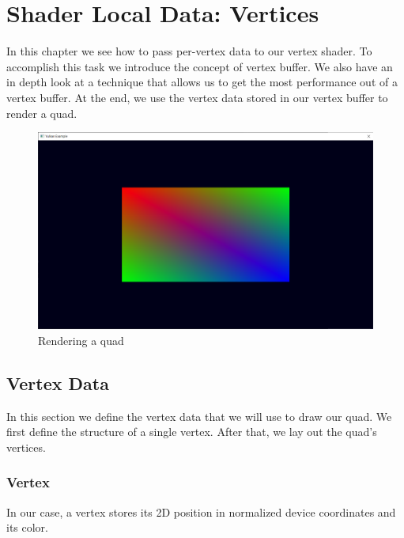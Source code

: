 \chapter{Shader Local Data: Vertices}
\label{chap:Vertices}

In this chapter we see how to pass per-vertex data to our vertex shader.
To accomplish this task we introduce the concept of vertex buffer.
We also have an in depth look at a technique that allows us to get
the most performance out of a vertex buffer.
At the end, we use the vertex data stored in our vertex buffer to render a quad.

\begin{figure}[ht]
    \centering
    \includegraphics[scale=0.20]{images/ChVertices/RenderQuad.png}
    \caption{Rendering a quad}
    \label{fig::RenderQuad}
\end{figure}

\section{Vertex Data}

In this section we define the vertex data that we will use to draw our quad.
We first define the structure of a single vertex.
After that, we lay out the quad's vertices.

\subsection{Vertex}

In our case, a vertex stores its 2D position in normalized device coordinates
and its color.

\begin{minipage}{\linewidth}{\noindent}
    
\end{minipage}

